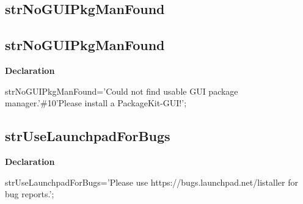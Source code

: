\documentclass{report}
\newif\ifpdf
\begin{document}
\subsection*{\large{\textbf{strNoGUIPkgManFound}}\normalsize\hspace{1ex}\hrulefill}
\else
\subsection*{strNoGUIPkgManFound}
\fi
\label{trstrings-strNoGUIPkgManFound}
\begin{list}{}{
\setlength{\itemindent}{0cm}
\setlength{\listparindent}{0cm}
\setlength{\leftmargin}{\evensidemargin}
\addtolength{\leftmargin}{\tmplength}
\settowidth{\labelsep}{X}
\addtolength{\leftmargin}{\labelsep}
\setlength{\labelwidth}{\tmplength}
}
\item[\textbf{Declaration}\hfill]
\ifpdf
\begin{flushleft}
\fi
\begin{ttfamily}
strNoGUIPkgManFound='Could not find usable GUI package manager.'{\#}10'Please install a PackageKit-GUI!';\end{ttfamily}

\ifpdf
\end{flushleft}
\fi

\end{list}
\ifpdf
\subsection*{\large{\textbf{strUseLaunchpadForBugs}}\normalsize\hspace{1ex}\hrulefill}
\else
\subsection*{strUseLaunchpadForBugs}
\fi
\label{trstrings-strUseLaunchpadForBugs}
\begin{list}{}{
\setlength{\itemindent}{0cm}
\setlength{\listparindent}{0cm}
\setlength{\leftmargin}{\evensidemargin}
\addtolength{\leftmargin}{\tmplength}
\settowidth{\labelsep}{X}
\addtolength{\leftmargin}{\labelsep}
\setlength{\labelwidth}{\tmplength}
}
\item[\textbf{Declaration}\hfill]
\ifpdf
\begin{flushleft}
\fi
\begin{ttfamily}
strUseLaunchpadForBugs='Please use https://bugs.launchpad.net/listaller for bug reports.';\end{ttfamily}

\ifpdf
\end{flushleft}
\fi

\end{list}
\ifpdf
\end{document}
